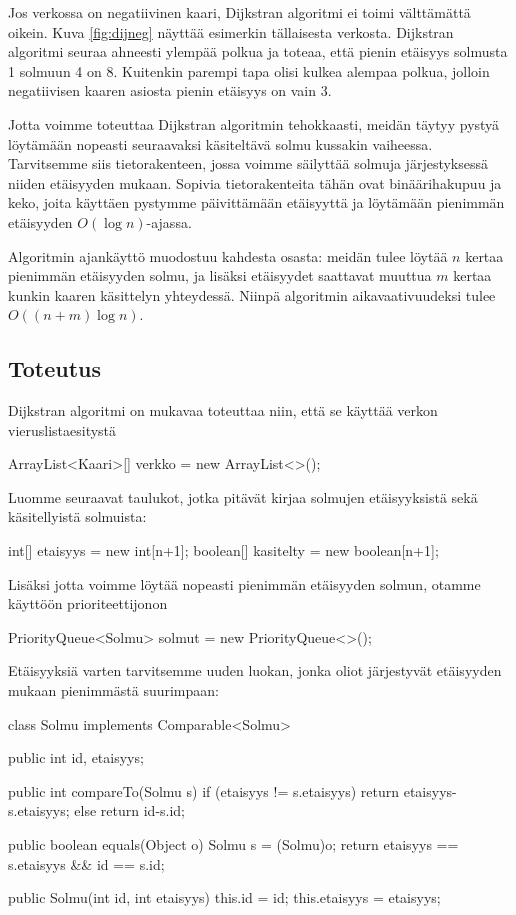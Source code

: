 Jos verkossa on negatiivinen kaari,
Dijkstran algoritmi ei toimi välttä\-mättä oikein.
Kuva \ref{fig:dijneg} näyttää esimerkin tällaisesta verkosta.
Dijkstran algoritmi seuraa ahneesti ylempää polkua ja toteaa,
että pienin etäisyys solmusta 1 solmuun 4 on 8.
Kuitenkin parempi tapa olisi kulkea alempaa polkua,
jolloin negatiivisen kaaren asiosta pienin etäisyys on vain 3.

Jotta voimme toteuttaa Dijkstran algoritmin tehokkaasti,
meidän täytyy pystyä löytämään nopeasti seuraavaksi käsiteltävä
solmu kussakin vaiheessa.
Tarvitsemme siis tietorakenteen, jossa voimme säilyttää
solmuja järjestykses\-sä niiden etäisyyden mukaan.
Sopivia tietorakenteita tähän ovat binääri\-hakupuu ja keko,
joita käyttäen pystymme päivittämään etäisyyttä ja löytämään
pienimmän etäisyyden $O(\log n)$-ajassa.

Algoritmin ajankäyttö muodostuu kahdesta osasta:
meidän tulee löytää $n$ kertaa pienimmän etäisyyden solmu,
ja lisäksi etäisyydet saattavat muuttua $m$ kertaa
kunkin kaaren käsittelyn yhteydessä.
Niinpä algoritmin aikavaativuudeksi tulee $O((n+m) \log n)$.

\subsection{Toteutus}

Dijkstran algoritmi on mukavaa toteuttaa niin, että
se käyttää verkon vieruslistaesitystä

\begin{code}
ArrayList<Kaari>[] verkko = new ArrayList<>();
\end{code}

Luomme seuraavat taulukot, jotka pitävät kirjaa solmujen etäisyyksistä
sekä käsitellyistä solmuista:

\begin{code}
int[] etaisyys = new int[n+1];
boolean[] kasitelty = new boolean[n+1];
\end{code}

Lisäksi jotta voimme löytää nopeasti pienimmän etäisyyden solmun,
otamme käyttöön prioriteettijonon

\begin{code}
PriorityQueue<Solmu> solmut = new PriorityQueue<>();
\end{code}

Etäisyyksiä varten tarvitsemme uuden luokan,
jonka oliot järjestyvät etäisyyden mukaan pienimmästä suurimpaan:

\begin{code}
class Solmu implements Comparable<Solmu> {
    public int id, etaisyys;

    public int compareTo(Solmu s) {
        if (etaisyys != s.etaisyys) return etaisyys-s.etaisyys;
        else return id-s.id;
    }

    public boolean equals(Object o) {
        Solmu s = (Solmu)o;
        return etaisyys == s.etaisyys && id == s.id;
    }

    public Solmu(int id, int etaisyys) {
        this.id = id;
        this.etaisyys = etaisyys;
    }
}
\end{code}

